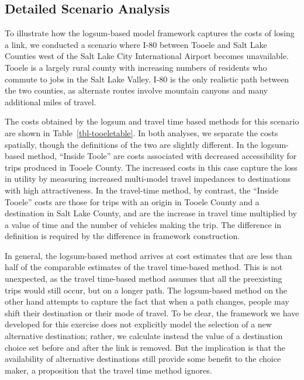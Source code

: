 \documentclass[
  letterpaper,
]{trb}
\begin{document}
\hypertarget{detailed-scenario-analysis}{%
\subsection{Detailed Scenario
Analysis}\label{detailed-scenario-analysis}}

To illustrate how the logsum-based model framework captures the costs of
losing a link, we conducted a scenario where I-80 between Tooele and
Salt Lake Counties west of the Salt Lake City International Airport
becomes unavailable. Tooele is a largely rural county with increasing
numbers of residents who commute to jobs in the Salt Lake Valley. I-80
is the only realistic path between the two counties, as alternate routes
involve mountain canyons and many additional miles of travel.

The costs obtained by the logsum and travel time based methods for this
scenario are shown in Table~\ref{tbl-tooeletable}. In both analyses, we
separate the costs spatially, though the definitions of the two are
slightly different. In the logsum-based method, ``Inside Toole'' are
costs associated with decreased accessibility for trips produced in
Tooele County. The increased costs in this case capture the loss in
utility by measuring increased multi-model travel impedances to
destinations with high attractiveness. In the travel-time method, by
contrast, the ``Inside Tooele'' costs are those for trips with an origin
in Tooele County and a destination in Salt Lake County, and are the
increase in travel time multiplied by a value of time and the number of
vehicles making the trip. The difference in definition is required by
the difference in framework construction.

In general, the logsum-based method arrives at cost estimates that are
less than half of the comparable estimates of the travel time-based
method. This is not unexpected, as the travel time-based method assumes
that all the preexisting trips would still occur, but on a longer path.
The logsum-based method on the other hand attempts to capture the fact
that when a path changes, people may shift their destination or their
mode of travel. To be clear, the framework we have developed for this
exercise does not explicitly model the selection of a new alternative
destination; rather, we calculate instead the value of a destination
choice set before and after the link is removed. But the implication is
that the availability of alternative destinations still provide some
benefit to the choice maker, a proposition that the travel time method
ignores.
\end{document}
